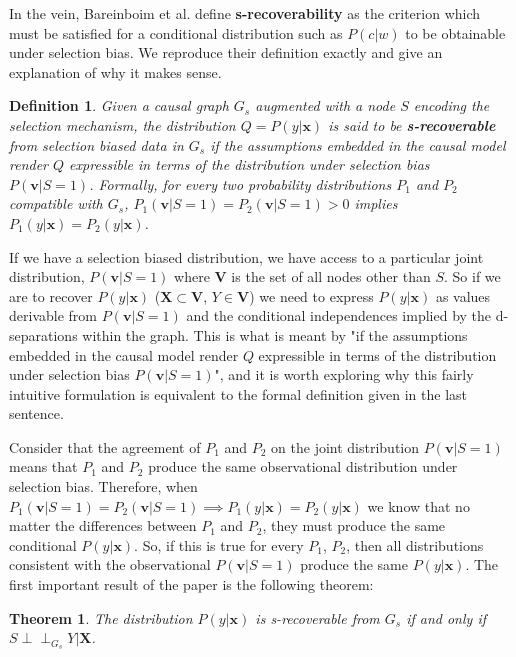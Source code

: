 \documentclass[12pt,twoside]{reedthesis}
\newtheorem{theorem}{Theorem}
\newtheorem{definition}{Definition}[section]
\theoremstyle{definition}
\newcommand{\dsep}{\perp \!\!\!\perp}
\begin{document}
In the vein, Bareinboim et al. define \textbf{s-recoverability} as the criterion which must be satisfied for a conditional distribution such as $P(c|w)$ to be obtainable under selection bias. We reproduce their definition exactly and give an explanation of why it makes sense.

\begin{definition}
Given a causal graph $G_s$ augmented with a node $S$ encoding the selection mechanism, the distribution $Q = P(y | \mathbf{x})$ is said to be \textbf{s-recoverable} from selection biased data in $G_s$ if the assumptions embedded in the causal model render $Q$ expressible in terms of the distribution under selection bias $P(\mathbf{v} | S = 1)$. Formally, for every two probability distributions $P_1$ and $P_2$ compatible with $G_s$, $P_1(\mathbf{v} | S = 1) = P_2(\mathbf{v} | S = 1) > 0$ implies $P_1(y | \mathbf{x}) = P_2(y | \mathbf{x})$.
\end{definition}

If we have a selection biased distribution, we have access to a particular joint distribution, $P(\mathbf{v} | S = 1)$ where $\mathbf{V}$ is the set of all nodes other than $S$. So if we are to recover $P(y | \mathbf{x})$ ($\mathbf{X} \subset \mathbf{V}$, $Y \in \mathbf{V}$) we need to express $P(y | \mathbf{x})$ as values derivable from $P(\mathbf{v} | S = 1)$ and the conditional independences implied by the d-separations within the graph. This is what is meant by "if the assumptions embedded in the causal model render $Q$ expressible in terms of the distribution under selection bias $P(\mathbf{v} | S = 1)$", and it is worth exploring why this fairly intuitive formulation is equivalent to the formal definition given in the last sentence.

Consider that the agreement of $P_1$ and $P_2$ on the joint distribution $P(\mathbf{v} | S = 1)$ means that $P_1$ and $P_2$ produce the same observational distribution under selection bias. Therefore, when $P_1(\mathbf{v} | S = 1) = P_2(\mathbf{v} | S = 1) \implies P_1(y | \mathbf{x}) = P_2(y | \mathbf{x})$ we know that no matter the differences between $P_1$ and $P_2$, they must produce the same conditional $P(y|\mathbf{x})$. So, if this is true for every $P_1$, $P_2$, then all distributions consistent with the observational $P(\mathbf{v} | S = 1)$ produce the same $P(y | \mathbf{x})$. 
The first important result of the paper is the following theorem:
\begin{theorem}
The distribution $P(y | \mathbf{x})$ is s-recoverable from $G_s$ if and only if $S \dsep_{G_s} Y | \mathbf{X}$.
\end{theorem}
\end{document}
